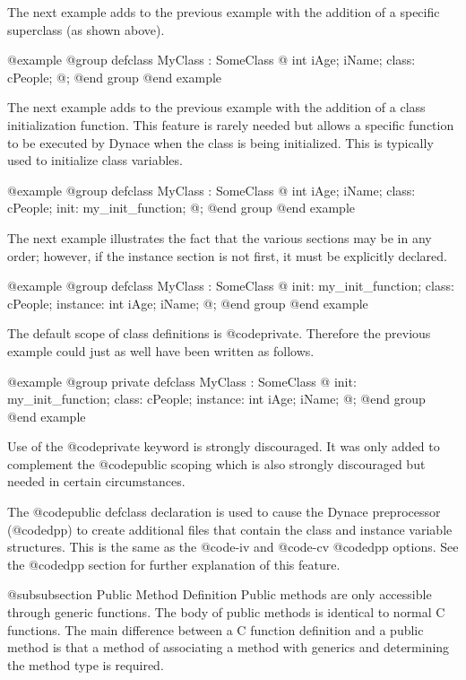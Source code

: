 The next example adds to the previous example with the addition of
a specific superclass (as shown above).

@example
@group
defclass   MyClass  :  SomeClass  @{
        int     iAge;
        iName;
 class:
        cPeople;
@};
@end group
@end example


The next example adds to the previous example with the addition of
a class initialization function.  This feature is rarely needed but allows
a specific function to be executed by Dynace when the class is being
initialized.  This is typically used to initialize class variables.

@example
@group
defclass   MyClass  :  SomeClass  @{
        int     iAge;
        iName;
 class:
        cPeople;
 init:  my_init_function;
@};
@end group
@end example


The next example illustrates the fact that the various sections
may be in any order; however, if the instance section is not first, it
must be explicitly declared.

@example
@group
defclass   MyClass  :  SomeClass  @{
 init:  my_init_function;
 class:
        cPeople;
 instance:
        int     iAge;
        iName;
@};
@end group
@end example

The default scope of class definitions is @code{private}.  Therefore
the previous example could just as well have been written as follows.

@example
@group
private  defclass   MyClass  :  SomeClass  @{
 init:  my_init_function;
 class:
        cPeople;
 instance:
        int     iAge;
        iName;
@};
@end group
@end example

Use of the @code{private} keyword is strongly discouraged.  It was only
added to complement the @code{public} scoping which is also strongly
discouraged but needed in certain circumstances.

The @code{public defclass} declaration is used to cause the Dynace
preprocessor (@code{dpp}) to create additional files that contain the
class and instance variable structures.  This is the same as the
@code{-iv} and @code{-cv} @code{dpp} options.  See the @code{dpp}
section for further explanation of this feature.



@subsubsection Public Method Definition
Public methods are only accessible through generic functions.
The body of public methods is identical to normal C functions.
The main difference between a C function definition and a public
method is that a method of associating a method with generics
and determining the method type is required.

